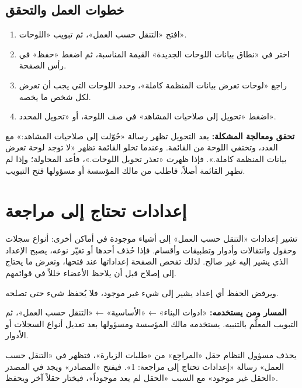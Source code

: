 \subsection{خطوات العمل والتحقق}
\begin{enumerate}
\item افتح «التنقل حسب العمل»، ثم تبويب «اللوحات».
\item اختر في «نطاق بيانات اللوحات الجديدة» القيمة المناسبة، ثم اضغط «حفظ» في رأس الصفحة.
\item راجع «لوحات تعرض بيانات المنظمة كاملة»، وحدد اللوحات التي يجب أن تعرض لكل شخص ما يخصه.
\item اضغط «تحويل إلى صلاحيات المشاهد» في صف اللوحة، أو «تحويل المحدد».
\end{enumerate}

\textbf{تحقق ومعالجة المشكلة:} بعد التحويل تظهر رسالة «حُوّلت إلى صلاحيات المشاهد:» مع العدد، وتختفي اللوحة من القائمة. وعندما تخلو القائمة تظهر «لا توجد لوحة تعرض بيانات المنظمة كاملة.». فإذا ظهرت «تعذر تحويل اللوحات.»، فأعد المحاولة؛ وإذا لم تظهر القائمة أصلاً، فاطلب من مالك المؤسسة أو مسؤولها فتح التبويب.

\clearpage
\section{إعدادات تحتاج إلى مراجعة}
\label{sec:builder-feature-work-navigation-stale}

تشير إعدادات «التنقل حسب العمل» إلى أشياء موجودة في أماكن أخرى: أنواع سجلات وحقول وانتقالات وأدوار وتطبيقات وأقسام. فإذا حُذف أحدها أو تغيّر نوعه، يصبح الإعداد الذي يشير إليه غير صالح. لذلك تفحص الصفحة إعداداتها عند فتحها، وتعرض ما يحتاج إلى إصلاح قبل أن يلاحظ الأعضاء خللاً في قوائمهم.

ويرفض الحفظ أي إعداد يشير إلى شيء غير موجود، فلا يُحفظ شيء حتى تصلحه.

\textbf{المسار ومن يستخدمه:} «ادوات البناء» ← «الأساسية» ← «التنقل حسب العمل»، ثم التبويب المعلَّم بالتنبيه. يستخدمه مالك المؤسسة ومسؤولها بعد تعديل أنواع السجلات أو الأدوار.

\begin{rcnote}
يحذف مسؤول النظام حقل «المراجِع» من «طلبات الزيارة»، فتظهر في «التنقل حسب العمل» رسالة «إعدادات تحتاج إلى مراجعة: 1». فيفتح «المصادر» ويجد في المصدر «الحقل غير موجود» مع السبب «الحقل لم يعد موجوداً»، فيختار حقلاً آخر ويحفظ.
\end{rcnote}

